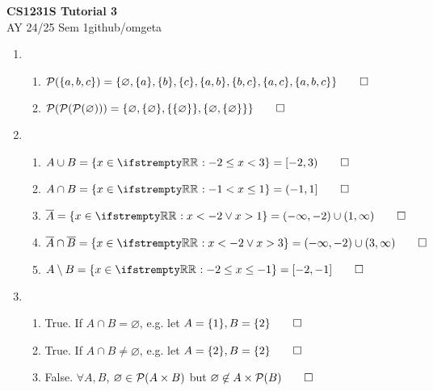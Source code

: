 \documentclass[12pt, a4paper]{article}
\newcommand{\mytitle}{CS1231S Tutorial 3}
\newcommand{\myauthor}{github/omgeta}
\newcommand{\mydate}{AY 24/25 Sem 1}
\begin{document}
\raggedright
\footnotesize
\begin{center}
{\normalsize{\textbf{\mytitle}}} \\
{\footnotesize{\mydate\hspace{2pt}\textemdash\hspace{2pt}\myauthor}}
\end{center}
\begin{enumerate}[Q\arabic*.]
  \item 
    \begin{enumerate}[(\alph*)]
      \item $\mathcal{P}(\{a, b, c\}) = \{\varnothing, \{a\}, \{b\}, \{c\}, \{a, b\}, \{b, c\}, \{a, c\}, \{a, b, c\}\} \qed$

      \item $\mathcal{P}(\mathcal{P}(\mathcal{P}(\varnothing))) = \{\varnothing, \{\varnothing\}, \{\{\varnothing\}\}, \{\varnothing, \{\varnothing\}\}\} \qed$
    \end{enumerate}

  \item 
    \begin{enumerate}[(\alph*)]
      \item $A \cup B = \{x \in \RR : -2 \leq x < 3\} = [-2, 3) \qed$
      \item $A \cap B = \{x \in \RR : -1 < x \leq 1\} = (-1, 1] \qed$
      \item $\overline{A} = \{x \in \RR : x < -2 \lor x > 1\} = (-\infty, -2) \cup (1, \infty) \qed$
      \item $\overline{A} \cap \overline{B} = \{x \in \RR : x < -2 \lor x > 3\} = (-\infty, -2) \cup (3, \infty) \qed$
      \item $A \setminus B = \{x \in \RR : -2 \leq x \leq -1\} = [-2, -1] \qed$
    \end{enumerate}

  \item  
    \begin{enumerate}[(\alph*)]
      \item True. If $A \cap B = \varnothing$, e.g. let $A = \{1\}, B = \{2\} \qed$ 
      \item True. If $A \cap B \neq \varnothing$, e.g. let $A = \{2\}, B = \{2\}\qed$
      \item False. $\forall A, B$, $\varnothing \in \mathcal{P}(A \times B)$ but $\varnothing \not\in A \times \mathcal{P}(B) \qed$
    \end{enumerate}


\end{enumerate}
\end{document}
